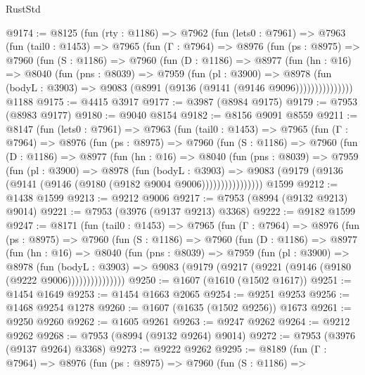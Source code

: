 \begin{lexlean}{RustStd}
\begin{coremodule}
@9174 := @8125
    (fun (rty : @1186) =>
    @7962
      (fun (lets0 : @7961) =>
      @7963
        (fun (tail0 : @1453) =>
        @7965
          (fun (Γ : @7964) =>
          @8976
            (fun (ps : @8975) =>
            @7960
              (fun (S : @1186) =>
              @7960
                (fun (D : @1186) =>
                @8977
                  (fun (hn : @16) =>
                  @8040
                    (fun (pns : @8039) =>
                    @7959
                      (fun (pl : @3900) =>
                      @8978
                        (fun (bodyL : @3903) =>
                        @9083 (@8991 (@9136 (@9141 (@9146 @9096)))))))))))))))
    @1188
@9175 := @4415 @3917
@9177 := @3987 (@8984 @9175)
@9179 := @7953 (@8983 @9177)
@9180 := @9040 @8154
@9182 := @8156 @9091 @8559
@9211 := @8147
    (fun (lets0 : @7961) =>
    @7963
      (fun (tail0 : @1453) =>
      @7965
        (fun (Γ : @7964) =>
        @8976
          (fun (ps : @8975) =>
          @7960
            (fun (S : @1186) =>
            @7960
              (fun (D : @1186) =>
              @8977
                (fun (hn : @16) =>
                @8040
                  (fun (pns : @8039) =>
                  @7959
                    (fun (pl : @3900) =>
                    @8978
                      (fun (bodyL : @3903) =>
                      @9083 (@9179 (@9136 (@9141 (@9146 (@9180 (@9182 @9004 @9006))))))))))))))))
    @1599
@9212 := @1438 @1599
@9213 := @9212 @9006
@9217 := @7953 (@8994 (@9132 @9213) @9014)
@9221 := @7953 (@3976 (@9137 @9213) @3368)
@9222 := @9182 @1599
@9247 := @8171
    (fun (tail0 : @1453) =>
    @7965
      (fun (Γ : @7964) =>
      @8976
        (fun (ps : @8975) =>
        @7960
          (fun (S : @1186) =>
          @7960
            (fun (D : @1186) =>
            @8977
              (fun (hn : @16) =>
              @8040
                (fun (pns : @8039) =>
                @7959
                  (fun (pl : @3900) =>
                  @8978
                    (fun (bodyL : @3903) =>
                    @9083 (@9179 (@9217 (@9221 (@9146 (@9180 (@9222 @9006)))))))))))))))
@9250 := @1607 (@1610 (@1502 @1617))
@9251 := @1454 @1649
@9253 := @1454 @1663 @2065
@9254 := @9251 @9253
@9256 := @1468 @9254 @1278
@9260 := @1607 (@1635 (@1502 @9256)) @1673
@9261 := @9250 @9260
@9262 := @1605 @9261
@9263 := @9247 @9262
@9264 := @9212 @9262
@9268 := @7953 (@8994 (@9132 @9264) @9014)
@9272 := @7953 (@3976 (@9137 @9264) @3368)
@9273 := @9222 @9262
@9295 := @8189
    (fun (Γ : @7964) =>
    @8976
      (fun (ps : @8975) =>
      @7960
        (fun (S : @1186) =>

\end{coremodule}
\end{lexlean}
